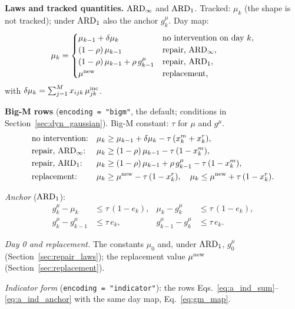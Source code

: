 \textbf{Laws and tracked quantities.} $\mathrm{ARD}_{\infty}$ and $\mathrm{ARD}_{1}$. Tracked: $\mu_k$
(the shape is not tracked); under $\mathrm{ARD}_{1}$ also the anchor $g^{\mu}_k$. Day map:
\begin{equation}
  \mu_k = \begin{cases}
    \mu_{k-1} + \delta\mu_k & \text{no intervention on day } k,\\
    (1-\rho)\,\mu_{k-1} & \text{repair, } \mathrm{ARD}_{\infty},\\
    (1-\rho)\,\mu_{k-1} + \rho\, g^{\mu}_{k-1} & \text{repair, } \mathrm{ARD}_{1},\\
    \mu^{\mathrm{new}} & \text{replacement,}
  \end{cases}
  \label{eq:gm_map}
\end{equation}
with $\delta\mu_k = \sum_{j=1}^{M} x_{ijk}\,\mu^{\mathrm{inc}}_{jk}$.

\textbf{Big-M rows} (\texttt{encoding = "bigm"}, the default; conditions in
Section~\ref{sec:dyn_gaussian}). Big-M constant: $\tau$ for $\mu$ and $g^{\mu}$.
\begin{align}
  &\text{no intervention:} & \mu_k &\geq \mu_{k-1} + \delta\mu_k - \tau\,(x^m_k + x^r_k),
    \label{eq:gm_mu_carry} \\
  &\text{repair, } \mathrm{ARD}_{\infty}\text{:} & \mu_k &\geq (1-\rho)\,\mu_{k-1} - \tau\,(1 - x^m_k),
    \label{eq:gm_mu_inf} \\
  &\text{repair, } \mathrm{ARD}_{1}\text{:} & \mu_k &\geq (1-\rho)\,\mu_{k-1} + \rho\, g^{\mu}_{k-1}
    - \tau\,(1 - x^m_k),
    \label{eq:gm_mu_one} \\
  &\text{replacement:} & \mu_k &\geq \mu^{\mathrm{new}} - \tau\,(1 - x^r_k), \quad
    \mu_k \leq \mu^{\mathrm{new}} + \tau\,(1 - x^r_k).
    \label{eq:gm_mu_repl}
\end{align}

\emph{Anchor} ($\mathrm{ARD}_{1}$):
\begin{align}
  g^{\mu}_k - \mu_k &\leq \tau\,(1 - e_k), & \mu_k - g^{\mu}_k &\leq \tau\,(1 - e_k),
    \label{eq:gm_anchor_set} \\
  g^{\mu}_k - g^{\mu}_{k-1} &\leq \tau\, e_k, & g^{\mu}_{k-1} - g^{\mu}_k &\leq \tau\, e_k.
    \label{eq:gm_anchor_keep}
\end{align}

\emph{Day 0 and replacement.} The constants $\mu_0$ and, under $\mathrm{ARD}_{1}$, $g^{\mu}_0$
(Section~\ref{sec:repair_laws}); the replacement value $\mu^{\mathrm{new}}$
(Section~\ref{sec:replacement}).

\emph{Indicator form} (\texttt{encoding = "indicator"}): the rows
Eqs.~\eqref{eq:a_ind_sum}--\eqref{eq:a_ind_anchor} with the same day map,
Eq.~\eqref{eq:gm_map}.

